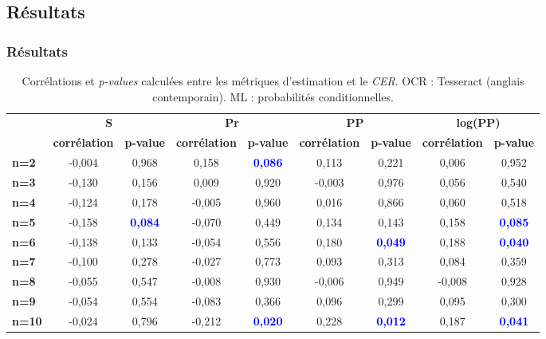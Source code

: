 \documentclass{beamer}
\begin{document}
		\subsection{Résultats}
		\begin{frame}\frametitle{Résultats}
		\begin{table}

		\begin{center}
	    \begin{tiny}
	    {\setlength{\tabcolsep}{0.1cm}
	    \begin{tabular}{l||cc|cc|cc|cc}  

	    \multirow{2}{*}{\textbf{}} & \multicolumn{2}{c}{\textbf{S}}         & \multicolumn{2}{c}{\textbf{Pr}}        & \multicolumn{2}{c}{\textbf{PP}}        & \multicolumn{2}{c}{\textbf{log(PP)}}   \\ 
	    & \textbf{corrélation} & \textbf{p-value} & \textbf{corrélation} & \textbf{p-value} & \textbf{corrélation} & \textbf{p-value} & \textbf{corrélation} & \textbf{p-value} \\ %
	    \textbf{n=2}  & -0,004 & 0,968 & 0,158  & \textcolor{blue}{\textbf{0,086}}          & 0,113  & 0,221          & 0,006  & 0,952          \\ %
	    \textbf{n=3}  & -0,130 & 0,156 & 0,009  & 0,920          & -0,003 & 0,976          & 0,056  & 0,540          \\ %
	    \textbf{n=4}  & -0,124 & 0,178 & -0,005 & 0,960          & 0,016  & 0,866          & 0,060  & 0,518          \\ %
	    \textbf{n=5}  & -0,158 & \textcolor{blue}{\textbf{0,084}} & -0,070 & 0,449          & 0,134  & 0,143          & 0,158  & \textcolor{blue}{\textbf{0,085}}          \\ %
	    \textbf{n=6}  & -0,138 & 0,133 & -0,054 & 0,556          & 0,180  & \textcolor{blue}{\textbf{0,049}} & 0,188  & \textcolor{blue}{\textbf{0,040}} \\ %
	    \textbf{n=7}  & -0,100 & 0,278 & -0,027 & 0,773          & 0,093  & 0,313          & 0,084  & 0,359          \\ %
	    \textbf{n=8}  & -0,055 & 0,547 & -0,008 & 0,930          & -0,006 & 0,949          & -0,008 & 0,928          \\ %
	    \textbf{n=9}  & -0,054 & 0,554 & -0,083 & 0,366          & 0,096  & 0,299          & 0,095  & 0,300          \\ %
	    \textbf{n=10} & -0,024 & 0,796 & -0,212 & \textcolor{blue}{\textbf{0,020}} & 0,228  & \textcolor{blue}{\textbf{0,012}} & 0,187  & \textcolor{blue}{\textbf{0,041}} \\ %
	    \end{tabular}}\label{tab:res_corr}
	    \end{tiny}
	    \end{center}  
	    \caption{Corrélations et \textit{p-values} calculées entre les métriques d'estimation et le \textit{CER}. OCR : Tesseract (anglais contemporain). ML : probabilités conditionnelles.}
	    \end{table}


\end{frame}
\end{document}
